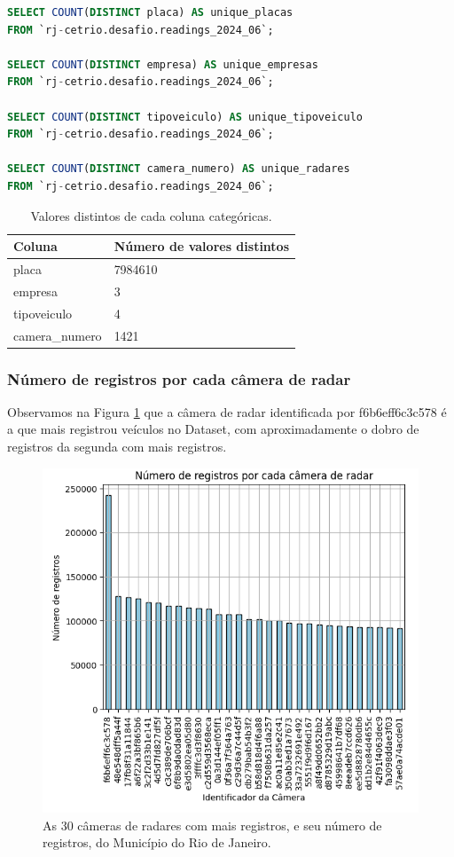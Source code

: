 \documentclass{article}
\begin{document}
\begin{lstlisting}[language=SQL,caption={Query SQL para contar quantidade de valores distintos para as colunas categóricas do dataset},label={lst:sqlquery}]
SELECT COUNT(DISTINCT placa) AS unique_placas
FROM `rj-cetrio.desafio.readings_2024_06`;

SELECT COUNT(DISTINCT empresa) AS unique_empresas
FROM `rj-cetrio.desafio.readings_2024_06`;

SELECT COUNT(DISTINCT tipoveiculo) AS unique_tipoveiculo
FROM `rj-cetrio.desafio.readings_2024_06`;

SELECT COUNT(DISTINCT camera_numero) AS unique_radares
FROM `rj-cetrio.desafio.readings_2024_06`;
\end{lstlisting}

\begin{table}
\centering
\begin{tabular}{|l|l|}
\hline
Coluna         & Número de valores distintos \\\hline
placa          & 7984610 \\\hline
empresa        & 3       \\\hline
tipoveiculo  & 4       \\\hline
camera\_numero & 1421    \\\hline
\end{tabular}
\caption{\label{tab:description}Valores distintos de cada coluna categóricas.}
\end{table}

\subsubsection{Número de registros por cada câmera de radar}

Observamos na Figura \ref{fig:freqCameraNumeroTop30} que a câmera de radar identificada por f6b6eff6c3c578 é a que mais registrou veículos no Dataset, com aproximadamente o dobro de registros da segunda com mais registros.

\begin{figure}
    \centering
    \includegraphics[width=0.75\linewidth]{freqCameraNumeroTop30.png}
    \caption{As 30 câmeras de radares com mais registros, e seu número de registros, do Município do Rio de Janeiro.}
    \label{fig:freqCameraNumeroTop30}
\end{figure}
\end{document}
